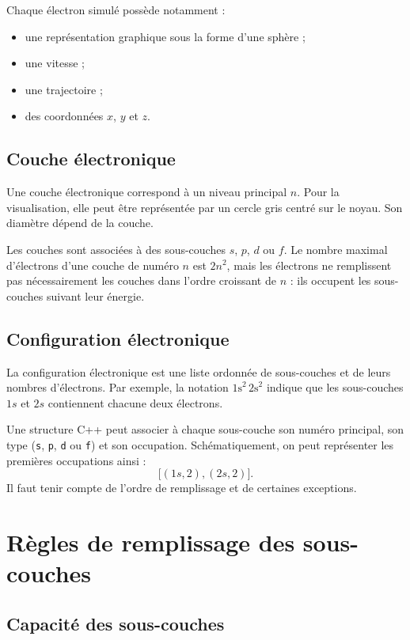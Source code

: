 \documentclass[a4paper,11pt]{article}
\begin{document}
Chaque électron simulé possède notamment :
\begin{itemize}[nosep]
    \item une représentation graphique sous la forme d'une sphère ;
    \item une vitesse ;
    \item une trajectoire ;
    \item des coordonnées \(x\), \(y\) et \(z\).
\end{itemize}

\subsection{Couche électronique}

Une couche électronique correspond à un niveau principal \(n\). Pour la
visualisation, elle peut être représentée par un cercle gris centré sur le
noyau. Son diamètre dépend de la couche.

Les couches sont associées à des sous-couches \(s\), \(p\), \(d\) ou \(f\).
Le nombre maximal d'électrons d'une couche de numéro \(n\) est \(2n^2\), mais
les électrons ne remplissent pas nécessairement les couches dans l'ordre
croissant de \(n\) : ils occupent les sous-couches suivant leur énergie.

\subsection{Configuration électronique}

La configuration électronique est une liste ordonnée de sous-couches et de
leurs nombres d'électrons. Par exemple, la notation
\(\text{1s}^2\,\text{2s}^2\) indique que les sous-couches \(1s\) et \(2s\)
contiennent chacune deux électrons.

Une structure C++ peut associer à chaque sous-couche son numéro principal,
son type (\texttt{s}, \texttt{p}, \texttt{d} ou \texttt{f}) et son occupation.
Schématiquement, on peut représenter les premières occupations ainsi :
\[
    \bigl[(1s,2), (2s,2)\bigr].
\]
Il faut tenir compte de l'ordre de remplissage et de certaines exceptions.

\section{Règles de remplissage des sous-couches}

\subsection{Capacité des sous-couches}
\end{document}
